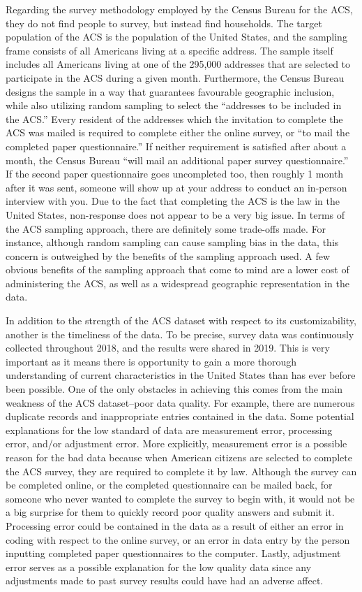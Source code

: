 \documentclass[
]{article}
\begin{document}
Regarding the survey methodology employed by the Census Bureau for the ACS, they do not find people to survey, but instead find households. The target population of the ACS is the population of the United States, and the sampling frame consists of all Americans living at a specific address. The sample itself includes all Americans living at one of the 295,000 addresses that are selected to participate in the ACS during a given month. Furthermore, the Census Bureau designs the sample in a way that guarantees favourable geographic inclusion, while also utilizing random sampling to select the ``addresses to be included in the ACS.'' Every resident of the addresses which the invitation to complete the ACS was mailed is required to complete either the online survey, or ``to mail the completed paper questionnaire.'' If neither requirement is satisfied after about a month, the Census Bureau ``will mail an additional paper survey questionnaire.'' If the second paper questionnaire goes uncompleted too, then roughly 1 month after it was sent, someone will show up at your address to conduct an in-person interview with you. Due to the fact that completing the ACS is the law in the United States, non-response does not appear to be a very big issue. In terms of the ACS sampling approach, there are definitely some trade-offs made. For instance, although random sampling can cause sampling bias in the data, this concern is outweighed by the benefits of the sampling approach used. A few obvious benefits of the sampling approach that come to mind are a lower cost of administering the ACS, as well as a widespread geographic representation in the data.

In addition to the strength of the ACS dataset with respect to its customizability, another is the timeliness of the data. To be precise, survey data was continuously collected throughout 2018, and the results were shared in 2019. This is very important as it means there is opportunity to gain a more thorough understanding of current characteristics in the United States than has ever before been possible. One of the only obstacles in achieving this comes from the main weakness of the ACS dataset--poor data quality. For example, there are numerous duplicate records and inappropriate entries contained in the data. Some potential explanations for the low standard of data are measurement error, processing error, and/or adjustment error. More explicitly, measurement error is a possible reason for the bad data because when American citizens are selected to complete the ACS survey, they are required to complete it by law. Although the survey can be completed online, or the completed questionnaire can be mailed back, for someone who never wanted to complete the survey to begin with, it would not be a big surprise for them to quickly record poor quality answers and submit it. Processing error could be contained in the data as a result of either an error in coding with respect to the online survey, or an error in data entry by the person inputting completed paper questionnaires to the computer. Lastly, adjustment error serves as a possible explanation for the low quality data since any adjustments made to past survey results could have had an adverse affect.
\end{document}
